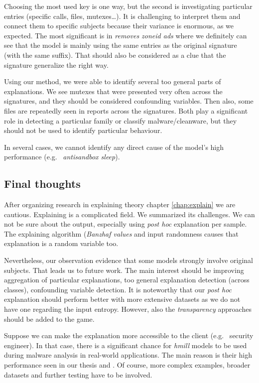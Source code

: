 Choosing the most used key is one way, but the second is investigating particular entries (specific calls, files, mutexes\dots). It is challenging to interpret them and connect them to specific subjects because their variance is enormous, as we expected. The most significant is in \emph{removes zoneid ads} where we definitely can see that the model is mainly using the same entries as the original signature (with the same suffix). That should also be considered as a clue that the signature generalize the right way.

Using our method, we were able to identify several too general parts of explanations. We see mutexes that were presented very often across the signatures, and they should be considered confounding variables. Then also, some files are repeatedly seen in reports across the signatures. Both play a significant role in detecting a particular family or classify malware/cleanware, but they should not be used to identify particular behaviour.

In several cases, we cannot identify any direct cause of the model's high performance (e.g. \ \emph{antisandbox sleep}).


\subsection{Final thoughts}
After organizing research in explaining theory chapter \ref{chap:explain} we are cautious. Explaining is a complicated field. We summarized its challenges. We can not be sure about the output, especially using \emph{post hoc} explanation per sample. The explaining algorithm (\emph{Banzhaf values} and  input randomness causes that explanation is a random variable too. 

Nevertheless, our observation evidence that some models strongly involve original subjects. That leads us to future work. The main interest should be improving aggregation of particular explanations, too general explanation detection (across classes), confounding variable detection. It is noteworthy that our \emph{post hoc} explanation should perform better with more extensive datasets as we do not have one regarding the input entropy. However, also the \emph{transparency} approaches should be added to the game. 

Suppose we can make the explanation more accessible to the client (e.g. \ security engineer). In that case, there is a significant chance for \emph{hmill} models to be used during malware analysis in real-world applications. The main reason is their high performance seen in our thesis and \cite{Mandlik2020} . Of course, more complex examples, broader datasets and further testing have to be involved.

